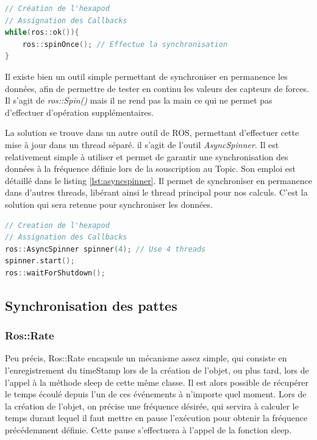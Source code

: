 \documentclass{tnreport}
\begin{document}
\begin{lstlisting}[language=c++,caption={Implémentation simple de la synchronisation de données}, label={lst:spinOnce}]
// Création de l'hexapod
// Assignation des Callbacks
while(ros::ok()){
    ros::spinOnce(); // Effectue la synchronisation 
}
\end{lstlisting}

Il existe bien un outil simple permettant de synchroniser en permanence les données, afin de permettre de tester en continu les valeurs des capteurs de forces. Il s'agit de \textit{ros::Spin()} mais il ne rend pas la main ce qui ne permet pas d'effectuer d'opération supplémentaires. 

La solution se trouve dans un autre outil de ROS, permettant d'effectuer cette mise à jour dans un thread séparé. il s'agit de l'outil \textit{AsyncSpinner}. Il est relativement simple à utiliser et permet de garantir une synchronisation des données à la fréquence définie lors de la souscription au Topic. Son emploi est détaillé dans le listing \ref{lst:asyncspinner}. Il permet de synchroniser en permanence dans d'autres threads, libérant ainsi le thread principal pour nos calculs. C'est la solution qui sera retenue pour synchroniser les données.  

\begin{lstlisting}[language=c++,caption={synchronisation dans un thread séparé}, label={lst:asyncspinner}]
// Creation de l'hexapod
// Assignation des Callbacks
ros::AsyncSpinner spinner(4); // Use 4 threads
spinner.start();
ros::waitForShutdown();
\end{lstlisting}

\subsection{Synchronisation des pattes}
\subsubsection{Ros::Rate}
Peu précis, Ros::Rate encapsule un mécanisme assez simple, qui consiste en l'enregistrement du timeStamp lors de la création de l'objet, ou plus tard, lors de l'appel à la méthode sleep de cette même classe. Il est alors possible de récupérer le temps écoulé depuis l'un de ces événements à n'importe quel moment. Lors de la création de l'objet, on précise une fréquence désirée, qui servira à calculer le temps durant lequel il faut mettre en pause l'exécution pour obtenir la fréquence précédemment définie. Cette pause s'effectuera à l'appel de la fonction sleep.
\end{document}
